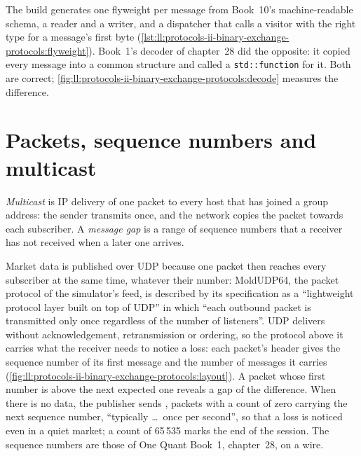 The build generates one flyweight per message from Book~10's machine-readable schema, a reader and a writer, and a dispatcher
that calls a visitor with the right type for a message's first byte (\cref{lst:ll:protocols-ii-binary-exchange-protocols:flyweight}).
Book~1's decoder of chapter~28 did the opposite: it copied every message into a common structure and called a
\texttt{std::function} for it. Both are correct; \cref{fig:ll:protocols-ii-binary-exchange-protocols:decode} measures the
difference.

\label{lst:ll:protocols-ii-binary-exchange-protocols:flyweight}

\section{Packets, sequence numbers and multicast}

\begin{definition}\label{def:ll:protocols-ii-binary-exchange-protocols:multicast}
\emph{Multicast} is IP delivery of one packet to every host that has joined a group address: the sender
transmits once, and the network copies the packet towards each subscriber. A \emph{message gap} is a range
of sequence numbers that a receiver has not received when a later one arrives.
\end{definition}

Market data is published over UDP  because one packet then reaches every subscriber at the same time, whatever their
number: MoldUDP64, the packet protocol of the simulator's feed, is described by its specification as a ``lightweight
protocol layer built on top of UDP'' in which ``each outbound packet is transmitted only once regardless of the number of
listeners''. UDP delivers without acknowledgement, retransmission or ordering, so the protocol above it carries what the
receiver needs to notice a loss: each packet's header gives the sequence number of its first message and the number of
messages it carries (\cref{fig:ll:protocols-ii-binary-exchange-protocols:layout}). A packet whose first number is above the
next expected one reveals a gap of the difference. When there is no data, the publisher sends , packets with a count
of zero carrying the next sequence number, ``typically \dots\ once per second'', so that a loss is noticed even in a quiet
market; a count of 65\,535 marks the end of the session. The sequence numbers are those of One Quant Book~1, chapter~28, on a
wire.

